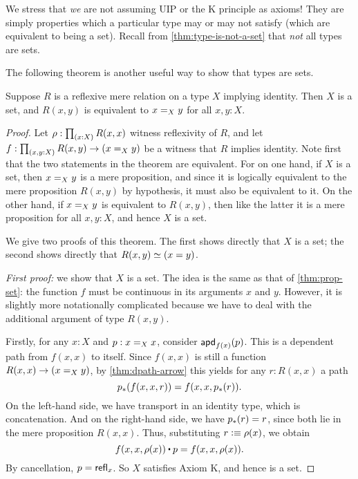 We stress that \emph{we} are not assuming UIP or the K principle as axioms!
They are simply properties which a particular type may or may not satisfy (which are equivalent to being a set).
Recall from \autoref{thm:type-is-not-a-set} that \emph{not} all types are sets.

The following theorem is another useful way to show that types are sets.

\begin{thm}\label{thm:h-set-refrel-in-paths-sets}
  Suppose $R$ is a reflexive mere relation on a type $X$ implying identity.
  Then $X$ is a set, and $R(x,y)$ is equivalent to $\id[X]{x}{y}$ for all $x,y:X$.
\end{thm}

\begin{proof}
  Let $\rho : \prd{x:X} R(x,x)$ witness reflexivity of $R$, and let $f : \prd{x,y:X} R(x,y) \to (\id[X]{x}{y})$ be a witness that $R$
implies identity.
  Note first that the two statements in the theorem are equivalent.
  For on one hand, if $X$ is a set, then $\id[X]xy$ is a mere proposition, and since it is logically equivalent to the mere proposition
$R(x,y)$ by hypothesis, it must also be equivalent to it.
  On the other hand, if $\id[X]xy$ is equivalent to $R(x,y)$, then like the latter it is a mere proposition for all $x,y:X$, and hence $X$
is a set.

  We give two proofs of this theorem.
  The first shows directly that $X$ is a set; the second shows directly that $R(x,y)\eqvsym (x=y)$.

  \emph{First proof:} we show that $X$ is a set.
  The idea is the same as that of \autoref{thm:prop-set}: the function $f$ must be continuous in its arguments $x$ and $y$.
  However, it is slightly more notationally complicated because we have to deal with the additional argument of type $R(x,y)$.

  Firstly, for any $x:X$ and $p:\id[X]xx$, consider $\apdfunc{f(x)}(p)$.
  This is a dependent path from $f(x,x)$ to itself.
  Since $f(x,x)$ is still a function $R(x,x) \to (\id[X]xy)$, by \autoref{thm:dpath-arrow} this yields for any $r:R(x,x)$ a path
  \[\trans{p}{f(x,x,r)} = f(x,x,\trans{p}r).
  \]
  On the left-hand side, we have transport in an identity type, which is concatenation.
  And on the right-hand side, we have $\trans{p}r = r$, since both lie in the mere proposition $R(x,x)$.
  Thus, substituting $r\defeq \rho(x)$, we obtain
  \[ f(x,x,\rho(x)) \ct p = f(x,x,\rho(x)). \]
  By cancellation, $p=\refl{x}$.
  So $X$ satisfies Axiom K, and hence is a set.


\end{proof}
